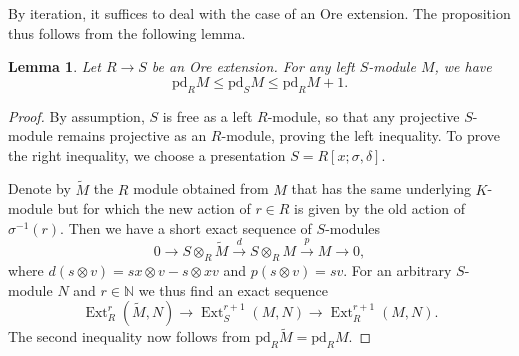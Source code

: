 \documentclass{amsart}
\numberwithin{equation}{section}
\newtheorem{lemma}[subsubsection]{Lemma}
\theoremstyle{definition}
\theoremstyle{remark}
\newcommand{\mN}{\mathbb{N}}
\newcommand{\pd}{\mathrm{pd}}
\newcommand{\Ext}{\operatorname{Ext}}
\begin{document}
By iteration, it suffices to deal with the case of an Ore extension. The proposition thus follows from the following lemma.
\begin{lemma}\label{lem:Ore}
Let $R\to S$ be an Ore extension. For any left $S$-module $M$, we have
\[\pd_RM\le\pd_SM\le \pd_R M+1.\]
\end{lemma}
\begin{proof}
By assumption, $S$ is free as a left $R$-module, so that any projective $S$-module remains projective as an $R$-module, proving the left inequality. To prove the right inequality, we choose a presentation $S=R[x;\sigma,\delta]$.

Denote by $\widetilde{M}$ the $R$ module obtained from $M$ that has the same underlying $K$-module but for which the new action of $r\in R$ is given by the old action of $\sigma^{-1}(r)$. Then we have a short exact sequence of $S$-modules
\[0\to S\otimes_R\widetilde{M}\xrightarrow{d} S\otimes_RM\xrightarrow{p} M\to 0,\]
where $d(s\otimes v)=sx\otimes v-s\otimes xv$ and $p(s\otimes v)=sv$. For an arbitrary $S$-module $N$ and $r\in\mN$ we thus find an exact sequence
\[\Ext^r_{R}(\widetilde{M},N)\to \Ext^{r+1}_S(M,N)\to \Ext^{r+1}_R(M,N).\]
The second inequality now follows from $\pd_R\widetilde{M}=\pd_RM$.
\end{proof}





\end{document}
